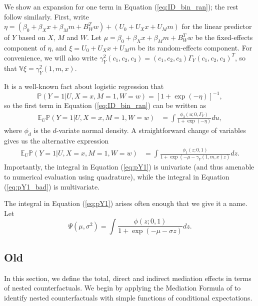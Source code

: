 \documentclass{article}
\newcommand{\bP}{\mathbb{P}}
\newcommand{\bE}{\mathbb{E}}
\newcommand{\bV}{\mathbb{V}}
\begin{document}
We show an expansion for one term in Equation (\ref{eq:ID_bin_ran}); the rest follow similarly. First, write $\eta = (\beta_0 + \beta_X x + \beta_M m + B_W^T w) + (U_0 + U_X x + U_M m)$ for the linear predictor of $Y$ based on $X$, $M$ and $W$. Let $\mu = \beta_0 + \beta_X x + \beta_M m + B_W^T w$ be the fixed-effects component of $\eta$, and $\xi = U_0 + U_X x + U_M m$ be its random-effects component. For convenience, we will also write $\gamma^2_Y(c_1, c_2, c_3) = (c_1, c_2, c_3) \Gamma_Y (c_1, c_2, c_3)^T$, so that $\bV \xi = \gamma^2_Y(1, m, x)$.

It is a well-known fact about logistic regression that
%
\begin{equation}
    \bP \left( Y=1 |U, X=x, M=1, W=w \right) = \left[1 + \exp(-\eta)\right]^{-1},
\end{equation}
%
so the first term in Equation (\ref{eq:ID_bin_ran}) can be written as
%
\begin{align}
    \bE_U \bP \left( Y=1 |U, X=x, M=1, W=w \right) & = \int \frac{\phi_3(u; 0, \Gamma_Y)}{1 + \exp(-\eta)} du, \label{eq:pY1_bad}
\end{align}
%
where $\phi_d$ is the $d$-variate normal density. A straightforward change of variables gives us the alternative expression
%
\begin{align}
    \bE_U \bP \left( Y=1 |U, X=x, M=1, W=w \right) & = \int \frac{\phi_1(z; 0, 1)}{1 + \exp(-\mu - \gamma_Y(1, m, x) z)} dz. \label{eq:pY1}
\end{align}
%
Importantly, the integral in Equation (\ref{eq:pY1}) is univariate (and thus amenable to numerical evaluation using quadrature), while the integral in Equation (\ref{eq:pY1_bad}) is multivariate.

The integral in Equation (\ref{eq:pY1}) arises often enough that we give it a name. Let
%
\begin{equation}
    \Psi(\mu, \sigma^2) = \int \frac{\phi(z; 0, 1)}{1 + \exp(-\mu - \sigma z)} dz.
\end{equation}


\subsection{Old}


In this section, we define the total, direct and indirect mediation effects in terms of nested counterfactuals. We begin by applying the Mediation Formula of \citet{Pea12} to identify nested counterfactuals with simple functions of conditional expectations.
\end{document}
